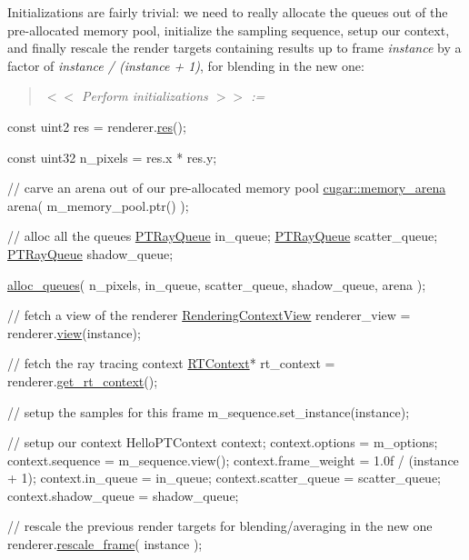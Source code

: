 \begin{DoxyParagraph}{}
Initializations are fairly trivial\+: we need to really allocate the queues out of the pre-\/allocated memory pool, initialize the sampling sequence, setup our context, and finally rescale the render targets containing results up to frame {\itshape instance} by a factor of {\itshape instance / (instance + 1)}, for blending in the new one\+: ~\newline
\label{_hello_renderer_page_Perform_initializations_anchor}%
%
 \begin{quote}
{\itshape  $<$$<$ Perform initializations $>$$>$ \+:= }

\end{quote}

\begin{DoxyCode}
\textcolor{keyword}{const} uint2 res = renderer.\hyperlink{struct_rendering_context_ad1a58510bdaf6f373080835abf5db2db}{res}();

\textcolor{keyword}{const} uint32 n\_pixels = res.x * res.y;

\textcolor{comment}{// carve an arena out of our pre-allocated memory pool}
\hyperlink{structcugar_1_1memory__arena}{cugar::memory\_arena} arena( m\_memory\_pool.ptr() );

\textcolor{comment}{// alloc all the queues}
\hyperlink{struct_p_t_ray_queue}{PTRayQueue} in\_queue;
\hyperlink{struct_p_t_ray_queue}{PTRayQueue} scatter\_queue;
\hyperlink{struct_p_t_ray_queue}{PTRayQueue} shadow\_queue;

\hyperlink{group___p_t_lib_gaf8daef8b815f7712ff692edbaa628881}{alloc\_queues}(
    n\_pixels,
    in\_queue,
    scatter\_queue,
    shadow\_queue,
    arena );

\textcolor{comment}{// fetch a view of the renderer}
\hyperlink{struct_rendering_context_view}{RenderingContextView} renderer\_view = renderer.\hyperlink{struct_rendering_context_a591062fd1887b069a015ede456dcaa93}{view}(instance);

\textcolor{comment}{// fetch the ray tracing context}
\hyperlink{struct_r_t_context}{RTContext}* rt\_context = renderer.\hyperlink{struct_rendering_context_af12ae90cc453d139f6f8ae35791e6563}{get\_rt\_context}();

\textcolor{comment}{// setup the samples for this frame}
m\_sequence.set\_instance(instance);

\textcolor{comment}{// setup our context}
HelloPTContext context;
context.options       = m\_options;
context.sequence      = m\_sequence.view();
context.frame\_weight  = 1.0f / (instance + 1);
context.in\_queue      = in\_queue;
context.scatter\_queue = scatter\_queue;
context.shadow\_queue  = shadow\_queue;

\textcolor{comment}{// rescale the previous render targets for blending/averaging in the new one}
    renderer.\hyperlink{struct_rendering_context_a6fb940a3b78a8a3faf82676c95ab1e6f}{rescale\_frame}( instance );
\end{DoxyCode}

\end{DoxyParagraph}
